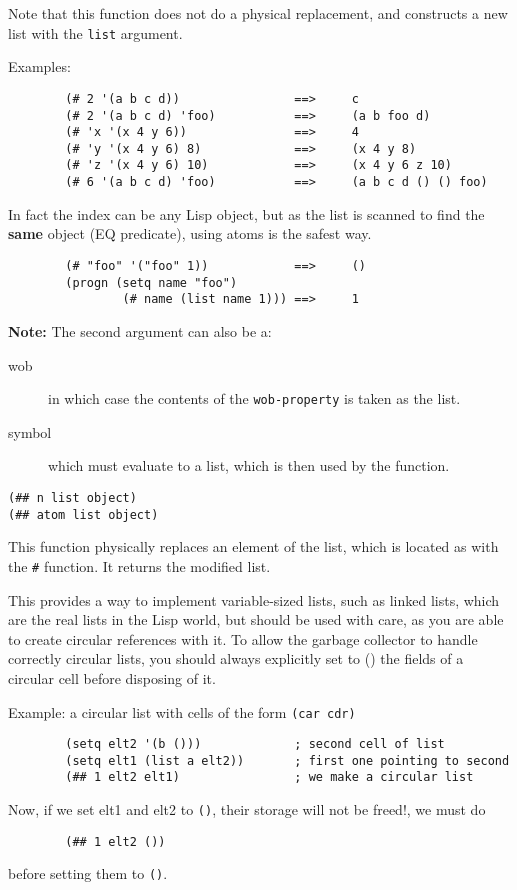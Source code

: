 Note that this function does not do a physical replacement, and constructs a
new list with the \verb"list" argument. 

{Examples:\exemplefont\upspace\begin{verbatim}
        (# 2 '(a b c d))                ==>     c
        (# 2 '(a b c d) 'foo)           ==>     (a b foo d)
        (# 'x '(x 4 y 6))               ==>     4
        (# 'y '(x 4 y 6) 8)             ==>     (x 4 y 8)
        (# 'z '(x 4 y 6) 10)            ==>     (x 4 y 6 z 10)
        (# 6 '(a b c d) 'foo)           ==>     (a b c d () () foo)
\end{verbatim}}

In fact the index can be any Lisp object, but as the list is scanned to find
the {\bf same} object (EQ predicate), using atoms is the safest way.

{\exemplefont\begin{verbatim} 
        (# "foo" '("foo" 1))            ==>     ()
        (progn (setq name "foo")
                (# name (list name 1))) ==>     1
\end{verbatim}}

{\bf Note:} The second argument can also be a:
\begin{description}
\item[wob] in which case the contents of the \verb"wob-property" is taken
as the list.
\item[symbol] which must evaluate to a list, which is then used by the
function.
\end{description}


{\usagefont\begin{verbatim}
(## n list object)
(## atom list object)
\end{verbatim}}\usageupspace

This function physically replaces an element of the list, which is located
as with the \verb"#" function. It returns the modified list. 

This provides a way to implement variable-sized lists, such as linked lists,
which are the real lists in the Lisp world, but should be used with care, as
you are able to create circular references with it. To allow the {\WOOL}
garbage collector to handle correctly circular lists, you should always
explicitly set to () the fields of a circular cell before disposing of it.

Example: a circular list with cells of the form \verb"(car cdr)"
{\exemplefont\begin{verbatim}
        (setq elt2 '(b ()))             ; second cell of list
        (setq elt1 (list a elt2))       ; first one pointing to second
        (## 1 elt2 elt1)                ; we make a circular list
\end{verbatim}}
Now, if we set elt1 and elt2 to \verb"()", their storage will not
be freed!, we must do
{\exemplefont\begin{verbatim}
        (## 1 elt2 ())
\end{verbatim}}
before setting them to \verb"()".

